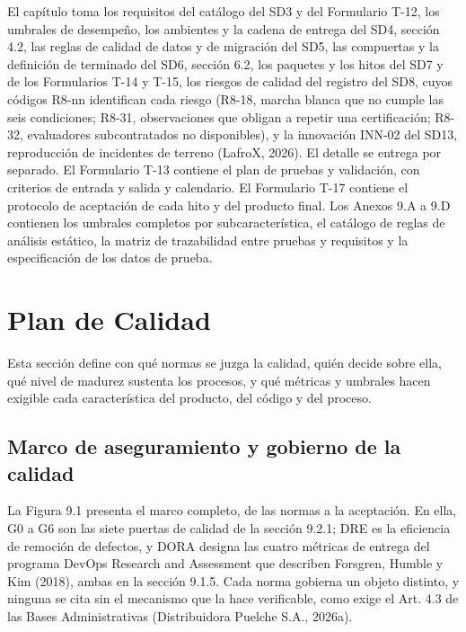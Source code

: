 El capítulo toma los requisitos del catálogo del SD3 y del Formulario T-12, los umbrales de desempeño, los ambientes y la cadena de entrega del SD4, sección 4.2, las reglas de calidad de datos y de migración del SD5, las compuertas y la definición de terminado del SD6, sección 6.2, los paquetes y los hitos del SD7 y de los Formularios T-14 y T-15, los riesgos de calidad del registro del SD8, cuyos códigos R8-nn identifican cada riesgo (R8-18, marcha blanca que no cumple las seis condiciones; R8-31, observaciones que obligan a repetir una certificación; R8-32, evaluadores subcontratados no disponibles), y la innovación INN-02 del SD13, reproducción de incidentes de terreno (LafroX, 2026). El detalle se entrega por separado. El Formulario T-13 contiene el plan de pruebas y validación, con criterios de entrada y salida y calendario. El Formulario T-17 contiene el protocolo de aceptación de cada hito y del producto final. Los Anexos 9.A a 9.D contienen los umbrales completos por subcaracterística, el catálogo de reglas de análisis estático, la matriz de trazabilidad entre pruebas y requisitos y la especificación de los datos de prueba.

\section{Plan de Calidad}

Esta sección define con qué normas se juzga la calidad, quién decide sobre ella, qué nivel de madurez sustenta los procesos, y qué métricas y umbrales hacen exigible cada característica del producto, del código y del proceso.

\subsection{Marco de aseguramiento y gobierno de la calidad}

La Figura 9.1 presenta el marco completo, de las normas a la aceptación. En ella, G0 a G6 son las siete puertas de calidad de la sección 9.2.1; DRE es la eficiencia de remoción de defectos, y DORA designa las cuatro métricas de entrega del programa DevOps Research and Assessment que describen Forsgren, Humble y Kim (2018), ambas en la sección 9.1.5. Cada norma gobierna un objeto distinto, y ninguna se cita sin el mecanismo que la hace verificable, como exige el Art. 4.3 de las Bases Administrativas (Distribuidora Puelche S.A., 2026a).



